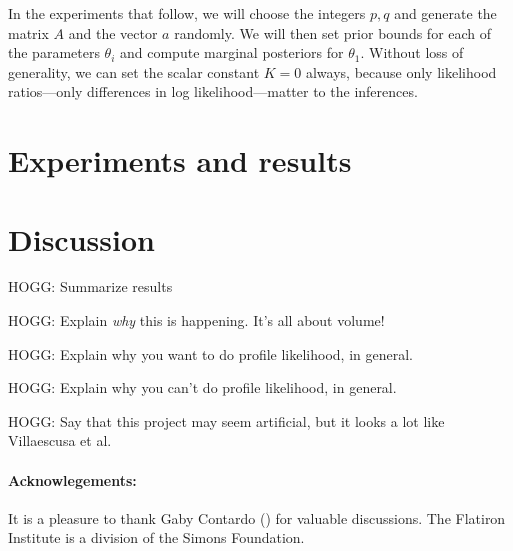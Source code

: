 \documentclass[10pt]{article}
\begin{document}
In the experiments that follow, we will choose the integers $p, q$ and generate the matrix $A$ and the vector $a$ randomly.
We will then set prior bounds for each of the parameters $\theta_i$ and compute marginal posteriors for $\theta_1$.
Without loss of generality, we can set the scalar constant $K=0$ always, because only likelihood ratios---only differences in log likelihood---matter to the inferences.

\section{Experiments and results}

\section{Discussion}

HOGG: Summarize results

HOGG: Explain \emph{why} this is happening. It's all about volume!

HOGG: Explain why you want to do profile likelihood, in general.

HOGG: Explain why you can't do profile likelihood, in general.

HOGG: Say that this project may seem artificial, but it looks a lot like Villaescusa et al.

\paragraph{Acknowlegements:}
It is a pleasure to thank
  Gaby Contardo ()
for valuable discussions.
The Flatiron Institute is a division of the Simons Foundation.

\end{document}
